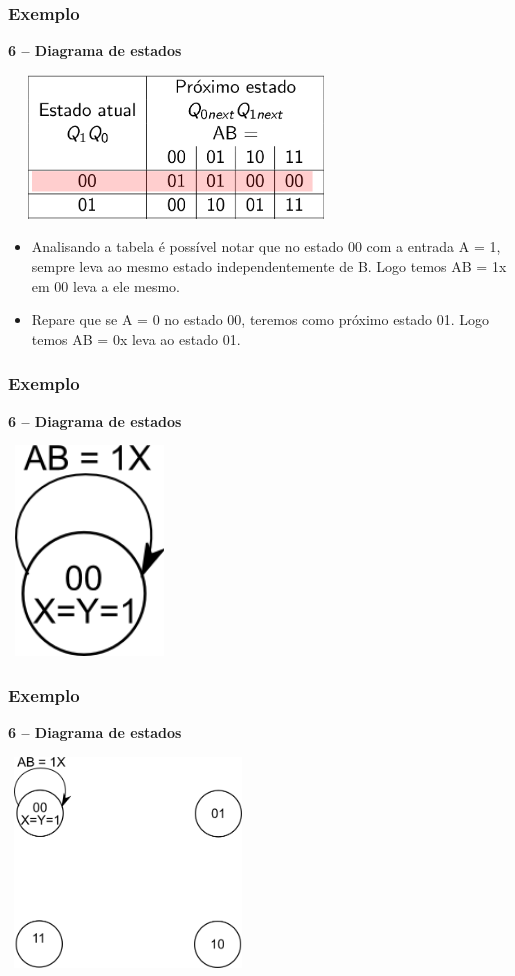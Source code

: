 \documentclass{beamer}
\begin{document}
\begin{frame}
  \frametitle{Exemplo}
  \textbf{6 – Diagrama de estados}
  \begin{center}
   \includegraphics[height = 1.5in, width =3.5in]
          {images/Diagrama_estado_tabela.png}
  \end{center}

  \begin{itemize}
   \item Analisando a tabela é possível notar que no estado 00 com a entrada 
    A = 1, sempre leva ao mesmo estado independentemente de B. Logo temos
    AB = 1x em 00 leva a ele mesmo.
    \pause 
   \item Repare que se A = 0 no estado 00, teremos como próximo estado 01. Logo 
    temos AB = 0x leva ao estado 01.
  \end{itemize} 
\end{frame}

\begin{frame}
  \frametitle{Exemplo}
  \textbf{6 – Diagrama de estados}
   \begin{center}
    \includegraphics[height = 2.2in, width =1.7in]
          {images/Diagrama_de_estado_ex1.png}
   \end{center}
\end{frame}

\begin{frame}
  \frametitle{Exemplo}
  \textbf{6 – Diagrama de estados}
   \begin{center}
    \includegraphics[height = 2.2in, width = 2.5in]
      {images/Diagrama_de_estado_ex2.png}
   \end{center}
\end{frame}
\end{document}
